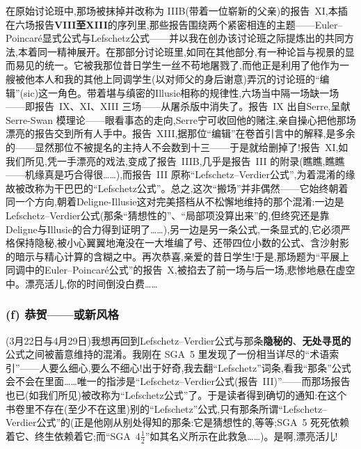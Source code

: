 在原始讨论班中,那场被抹掉并改称为 IIIB(带着一位\dmark{}崭新的父亲)的报告~XI,本插在六场报告\textbf{VIII至XIII}的序列里,那些报告围绕两个紧密相连的主题——Euler--Poincaré显式公式与Lefschetz公式——并以我在创办该讨论班之际提炼出的共同方法,本着同一精神展开。在那部分讨论班里,如同在其他部分,有一种论旨与视景的显而易见的统一。它被我那位昔日学生一丝不苟地屠戮了,而他正是利用了他作为一艘被他本人和我的其他上同调学生(以对师父的身后谢意)弄沉的讨论班的“编辑”(sic)这一角色。带着堪与缜密的Illusie相称的规律性,六场当中隔一场缺一场——即报告~IX、XI、XIII 三场——从屠杀版中消失了。报告~IX 出自Serre,呈献 Serre-Swan 模理论——眼看事态的走向,Serre宁可收回他的赌注,亲自操心把他那场漂亮的报告交到所有人手中。报告~XIII,据那位“编辑”在卷首引言中的解释,是多余的——显然那位不被提名的主持人不会数到十三——于是就给删掉了!报告~XI,如我们所见,凭一手漂亮的戏法,变成了报告~IIIB,几乎是报告~III 的附录(瞧瞧,瞧瞧——机缘真是巧合得很……),而报告~III 原称“Lefschetz--Verdier公式”,为着混淆的缘故被改称为干巴巴的“Lefschetz公式”。总之,这次“搬场”并非偶然——它始终朝着同一个方向,朝着Deligne-Illusie这对完美搭档从不松懈地维持的那个混淆:一边是Lefschetz--Verdier公式(那条“猜想性的”、“局部项没算出来”的,但终究还是靠Deligne与Illusie的合力得到证明了……),另一边是另一条公式,一条显式的,它必须严格保持隐秘,被小心翼翼地淹没在一大堆编了号、还带四位小数的公式、含沙射影的暗示与精心计算的含糊之中。再次恭喜,亲爱的昔日学生!于是,那场题为“平展上同调中的Euler--Poincaré公式”的报告~X,被掐去了前一场与后一场,悲惨地悬在虚空中。漂亮活儿,你的时间倒没白费……

\subsubsection*{(f) 恭贺——或新风格}



(3月22日与4月29日)我想再回到Lefschetz--Verdier公式与那条\textbf{隐秘的}、\dmark{}\textbf{无处寻觅的}公式之间被蓄意维持的混淆。我刚在 SGA~5 里发现了一份相当详尽的“术语索引”——人要么细心,要么不细心!出于好奇,我去翻“Lefschetz”词条,看我“那条”公式会不会在里面……唯一的指涉是“Lefschetz--Verdier公式(报告~III)”——而那场报告也已(如我们所见)被改称为“Lefschetz公式”了。于是读者得到确切的通知:在这个书卷里不存在(至少不在这里)别的“Lefschetz”公式,只有那条所谓“Lefschetz--Verdier公式”的(正是他刚从别处得知的那条:它是猜想性的,等等;SGA~5 死死依赖着它、终生依赖着它;而“SGA~4$\frac{1}{2}$”如其名义所示在此救急……)。是啊,漂亮活儿!

